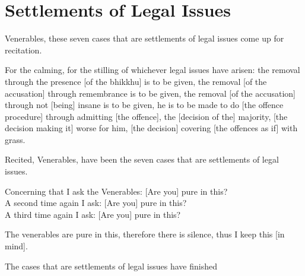 
\section{Settlements of Legal Issues}
\label{settlements}

\begin{intro}
	Venerables, these seven cases that are settlements of legal issues come up for recitation.
\end{intro}

For the calming, for the stilling of whichever legal issues have arisen: the removal through the presence [of the bhikkhu] is to be given, the removal [of the accusation] through remembrance is to be given, the removal [of the accusation] through not [being] insane is to be given, he is to be made to do [the offence procedure] through admitting [the offence], the [decision of the] majority, [the decision making it] worse for him, [the decision] covering [the offences as if] with grass.

\medskip

\begin{center}
	Recited, Venerables, have been the seven cases that are settlements of legal issues.

	\smallskip

	Concerning that I ask the Venerables: [Are you] pure in this?\\
	A second time again I ask: [Are you] pure in this?\\
	A third time again I ask: [Are you] pure in this?

	\smallskip

	The venerables are pure in this, therefore there is silence, thus I keep this [in mind].
\end{center}

\begin{outro}
	The cases that are settlements of legal issues have finished
\end{outro}

\clearpage

